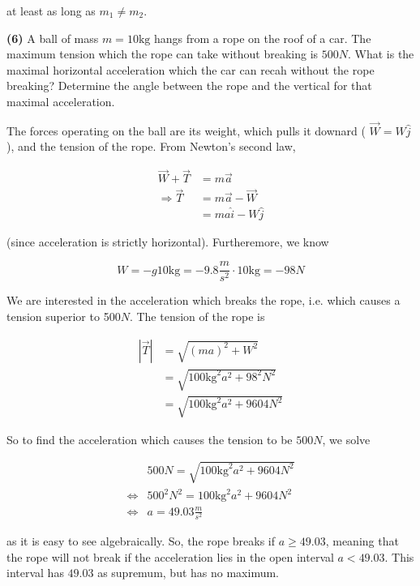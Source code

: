 \documentclass[12pt]{article}
\theoremstyle{definition}
\begin{document}
at least as long as $m_1 \neq m_2$.

\pagebreak 

\begin{shaded}
    \textbf{(6)} A ball of mass $m = 10\text{kg}$ hangs from a rope on the roof
    of a car. The maximum tension which the rope can take without breaking is
    $500N$. What is the maximal horizontal acceleration which the car can recah
    without the rope breaking? Determine the angle between the rope and the
    vertical for that maximal acceleration.
\end{shaded}

The forces operating on the ball are its weight, which pulls it downard (
$\vec{W} = W \hat{j}$), and the tension of the rope. From Newton's second law, 

\begin{align*}
    \vec{W} + \vec{T} &= m \vec{a} \\ 
    \Rightarrow \vec{T} &= m\vec{a} - \vec{W} \\ 
                        &= ma
    \hat{i} - W \hat{j}
\end{align*}

(since acceleration is strictly horizontal). Furtheremore, we know 

\begin{equation*}
    W = -g10 \text{kg} = -9.8 \frac{m}{s^2} \cdot 10\text{kg} = -98N
\end{equation*}

We are interested in the acceleration which breaks the rope, i.e. which causes a
tension superior to 500$N$. The tension of the rope is 

\begin{align*}
    \left| \vec{T} \right| 
    &= \sqrt{(ma)^2 + W^2} \\ 
    &= \sqrt{100\text{kg}^2 a^2 + 98^2N^2} \\ 
    &= \sqrt{100\text{kg}^2 a^2 + 9604N^2}
\end{align*}

So to find the acceleration which causes the tension to be $500N$, we solve

\begin{align*}
    &500N = \sqrt{100\text{kg}^2 a^2 + 9604N^2} \\ 
    \iff &500^2 N^2 = 100\text{kg}^2 a^2 + 9604N^2 \\ 
    \iff &a = 49.03 \frac{m}{s^2}
\end{align*}

as it is easy to see algebraically. So, the rope breaks if $a \geq 49.03$,
meaning that the rope will not break if the acceleration lies in the open
interval $a < 49.03$. This interval has $49.03$ as supremum, but has no maximum.
\end{document}
